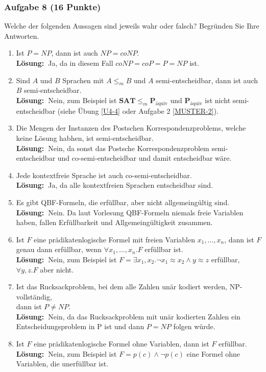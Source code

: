 \documentclass[a4paper,10pt]{article}
\newcommand{\f}[1]{\textbf{#1}}
\newcommand{\LOES}{\f{Lösung:~}}
\newcommand{\prob}[1]{\textbf{#1}}
\newcommand{\prspec}[1]{\prob{P}_{\text{#1}}}
\newcommand{\paq}{\prspec{äquiv}}
\begin{document}
\subsubsection*{Aufgabe 8 (16 Punkte)}
Welche der folgenden Aussagen sind jeweils wahr oder falsch? Begründen Sie Ihre Antworten.
\begin{enumerate}
\item Ist $P = NP$, dann ist auch $NP = coNP$. \\
\LOES Ja\POINT, da in diesem Fall $coNP = coP = P = NP$ ist.\POINT
\item Sind $A$ und $B$ Sprachen mit $A \leq_m B$ und $A$ semi-entscheidbar, dann ist auch $B$ semi-entscheidbar. \\
\LOES Nein\POINT, zum Beispiel ist $\prob{SAT} \leq_m \paq$ und $\paq$ ist nicht semi-entscheidbar (siehe Übung \ref{U4-4} oder Aufgabe 2 \ref{MUSTER-2}).\POINT
\item Die Mengen der Instanzen des Postschen Korrespondenzproblems, welche keine Lösung habhen, ist semi-entscheidbar. \\
\LOES Nein\POINT, da sonst das Postsche Korrespondenzproblem semi-entscheidbar und co-semi-entscheidbar und damit entscheidbar wäre.\POINT
\item Jede kontextfreie Sprache ist auch co-semi-entscheidbar. \\
\LOES Ja\POINT, da alle kontextfreien Sprachen entscheidbar sind.\POINT
\item Es gibt QBF-Formeln, die erfüllbar, aber nicht allgemeingültig sind. \\
\LOES Nein\POINT. Da laut Vorlesung QBF-Formeln niemals freie Variablen haben, fallen Erfüllbarkeit und Allgemeingültigkeit zusammen.\POINT
\item Ist $F$ eine prädikatenlogische Formel mit freien Variablen $x_1,\dots,x_n$, dann ist $F$ genau dann erfüllbar, wenn $\forall x_1,\dots,x_n.F$ erfüllbar ist. \\
\LOES Nein\POINT, zum Beispiel ist $F = \exists x_1, x_2.\neg x_1 \approx x_2 \land y \approx z$ erfüllbar, $\forall y,z.F$ aber nicht.\POINT
\item Ist das Rucksackproblem, bei dem alle Zahlen unär kodiert werden, NP-vollständig,\\
dann ist $P \not= NP$. \\
\LOES Nein\POINT, da das Rucksackproblem mit unär kodierten Zahlen ein Entscheidungsproblem in P ist und dann $P = NP$ folgen würde.\POINT
\item Ist $F$ eine prädikatenlogische Formel ohne Variablen, dann ist $F$ erfüllbar. \\
\LOES Nein\POINT, zum Beispiel ist $F = p(c) \land \neg p(c)$ eine Formel ohne Variablen, die unerfüllbar ist.\POINT
\end{enumerate}
\end{document}
